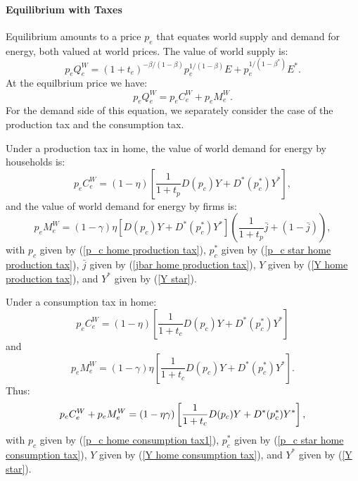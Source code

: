 \documentclass[notitlepage,12pt]{article}
\begin{document}
\paragraph{Equilibrium with Taxes}

Equilibrium amounts to a price $p_{e}$ that equates world supply and demand
for energy, both valued at world prices. The value of world supply is:%
\begin{equation*}
p_{e}Q_{e}^{W}=\left( 1+t_{e}\right) ^{-\beta /(1-\beta )}p_{e}^{1/(1-\beta
)}E+p_{e}^{1/(1-\beta ^{\ast })}E^{\ast }.
\end{equation*}%
At the equilbrium price we have:%
\begin{equation*}
p_{e}Q_{e}^{W}=p_{e}C_{e}^{W}+p_{e}M_{e}^{W}.
\end{equation*}%
For the demand side of this equation, we separately consider the case of the
production tax and the consumption tax.

Under a production tax in home, the value of world demand for energy by
households is:%
\begin{equation*}
p_{e}C_{e}^{W}=\left( 1-\eta \right) \left[ \frac{1}{1+t_{p}}%
D(p_{c})Y+D^{\ast }(p_{c}^{\ast })Y^{\ast }\right] ,
\end{equation*}%
and the value of world demand for energy by firms is:%
\begin{equation*}
p_{e}M_{e}^{W}=\left( 1-\gamma \right) \eta \left[ D(p_{c})Y+D^{\ast
}(p_{c}^{\ast })Y^{\ast }\right] \left( \frac{1}{1+t_{p}}\bar{j}+\left( 1-%
\bar{j}\right) \right) ,
\end{equation*}%
with $p_{c}$ given by (\ref{p_c home production tax}), $p_{c}^{\ast }$ given
by (\ref{p_c star home production tax}), $\bar{j}$ given by (\ref{jbar home
production tax}), $Y$ given by (\ref{Y home production tax}), and $Y^{\ast }$
given by (\ref{Y star}).

Under a consumption tax in home:%
\begin{equation*}
p_{e}C_{e}^{W}=\left( 1-\eta \right) \left[ \frac{1}{1+t_{c}}%
D(p_{c})Y+D^{\ast }(p_{c}^{\ast })Y^{\ast }\right]
\end{equation*}%
and%
\begin{equation*}
p_{e}M_{e}^{W}=\left( 1-\gamma \right) \eta \left[ \frac{1}{1+t_{c}}%
D(p_{c})Y+D^{\ast }(p_{c}^{\ast })Y^{\ast }\right] .
\end{equation*}%
Thus:%
\begin{equation*}
p_{e}C_{e}^{W}+p_{e}M_{e}^{W}=\left( 1-\eta \gamma \right) \left[ \frac{1}{%
1+t_{c}}D(p_{c})Y+D^{\ast }(p_{c}^{\ast })Y^{\ast }\right] ,
\end{equation*}%
with $p_{c}$ given by (\ref{p_c home consumption tax1}), $p_{c}^{\ast }$
given by (\ref{p_c star home consumption tax}), $Y$ given by (\ref{Y home
consumption tax}), and $Y^{\ast }$ given by (\ref{Y star}).
\end{document}
